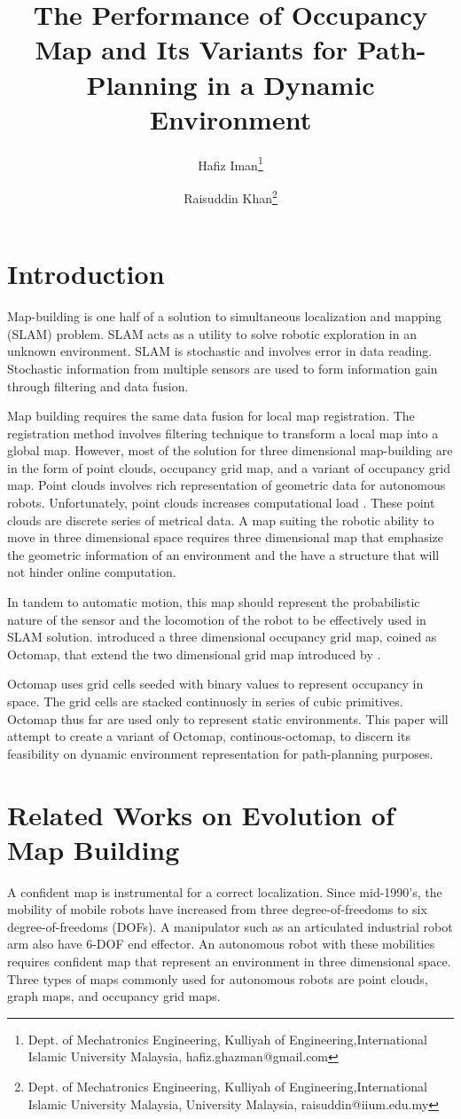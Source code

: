 \documentclass[a4paper,10pt]{article}
\title{The Performance of Occupancy Map and Its Variants for Path-Planning in
a Dynamic Environment}
\author{
		Hafiz Iman\thanks{Dept. of Mechatronics Engineering,
			Kulliyah of Engineering,International Islamic University Malaysia,
			hafiz.ghazman@gmail.com} 
		\and 
		Raisuddin Khan\thanks{Dept. of Mechatronics Engineering,
			Kulliyah of Engineering,International Islamic University Malaysia,
			University Malaysia,
			raisuddin@iium.edu.my}
			}
\begin{document}
\maketitle

\section{Introduction}
Map-building is one half of a solution to simultaneous localization and mapping
(SLAM) problem. SLAM acts as a utility to solve robotic exploration in an unknown
environment. SLAM is stochastic and involves error in data reading. Stochastic
information from multiple sensors are used to form information gain through
filtering and data fusion. 

Map building requires the same data fusion for local
map registration. The registration method involves filtering technique to
transform a local map into a global map. However, most of the solution for three
dimensional map-building are in the form of point clouds, occupancy grid map,
and a variant of occupancy grid map. Point clouds involves
rich representation of geometric data for autonomous robots. Unfortunately, point
clouds increases computational
load \citep{Borrmann2008,Cole2006,Engelhard2011,Weingarten2005}. These point clouds are discrete series of metrical data. A
map suiting the robotic ability to move in three dimensional space requires
three dimensional map that emphasize the geometric information of an
environment and the have a structure that will not hinder online computation.

In tandem to automatic motion, this map should represent the probabilistic
nature of the sensor and the locomotion of the robot to be effectively used in
SLAM solution. \citet{Hornung2013} introduced a three dimensional occupancy grid
map, coined as Octomap, that extend the two dimensional grid map introduced by \citet{Elfes1989}.

Octomap uses grid cells seeded with binary values to represent occupancy in
space. The grid cells are stacked continuosly in series of cubic primitives.
Octomap thus far are used only to represent static environments. This paper will
attempt to create a variant of Octomap, continous-octomap, to discern its
feasibility on dynamic environment representation for path-planning purposes. 

\section{Related Works on Evolution of Map Building}
A confident map is instrumental for a correct localization. Since mid-1990's, the
mobility of mobile robots have increased from three degree-of-freedoms to six
degree-of-freedoms (DOFs). A manipulator such as an articulated  industrial
robot arm also have 6-DOF end effector. An autonomous robot with these 
mobilities requires confident map that represent an environment in three 
dimensional space. Three types of 
maps commonly used for autonomous robots are point clouds, graph maps, and
occupancy grid maps. 
\end{document}
